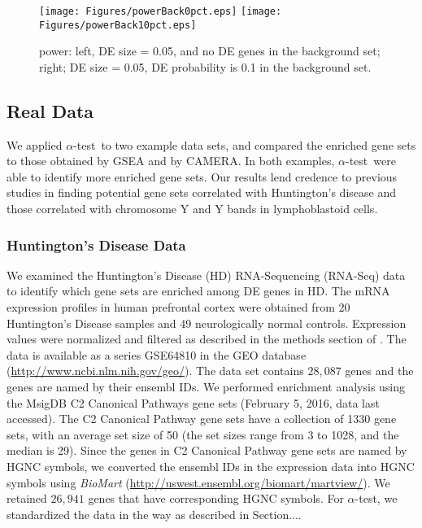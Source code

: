 \documentclass[useAMS,usenatbib, galley]{biom}
\newcommand{\OurMethod}{$\alpha$-test}
\begin{document}
	\begin{figure}[H]
		\begin{center}
			\texttt{[image: Figures/powerBack0pct.eps]}
			\texttt{[image: Figures/powerBack10pct.eps]}
		\end{center} 
			\caption{power: left, DE size = 0.05, and no DE genes in the background set; right; DE size = 0.05, DE probability is 0.1 in the background set.}\label{fig:power}
	\end{figure} 
	
	\subsection{Real Data}
	We applied \OurMethod~to two example data sets, and compared the enriched gene sets to those obtained by GSEA and by CAMERA. In both examples, \OurMethod~were able to identify more enriched gene sets. Our results lend credence to previous studies in finding potential gene sets correlated with Huntington's disease and those correlated with chromosome Y and Y bands in lymphoblastoid cells.  
	
	\subsubsection{Huntington's Disease Data}
	We examined the Huntington's Disease (HD) RNA-Sequencing (RNA-Seq) data \citep{labadorf2015rna}  to identify which gene sets are enriched among DE genes in HD. The mRNA expression profiles in human prefrontal cortex were obtained from 20 Huntington's Disease samples and 49 neurologically normal controls.  Expression values were normalized and filtered as described in the methods section of \cite{labadorf2015rna}.
	The data is available as a series GSE64810 in the GEO database (\url{http://www.ncbi.nlm.nih.gov/geo/}). The data set contains $28,087$ genes and the genes are named by their ensembl IDs. We performed enrichment analysis using the MsigDB \citep{subramanian2005gene} C2 Canonical Pathways gene sets (February 5, 2016, data last accessed). The C2 Canonical Pathway gene sets have a collection of 1330 gene sets, with an average set size of 50 (the set sizes range from 3 to 1028, and the median is 29). Since the genes in C2 Canonical Pathway gene sets are named by HGNC symbols, we converted the ensembl IDs in the expression data into HGNC symbols using \textit{BioMart} (\url{http://uswest.ensembl.org/biomart/martview/}). We retained $26,941$ genes that have corresponding HGNC symbols. For \OurMethod, we standardized the data in the way as described in Section....
	
\end{document}
